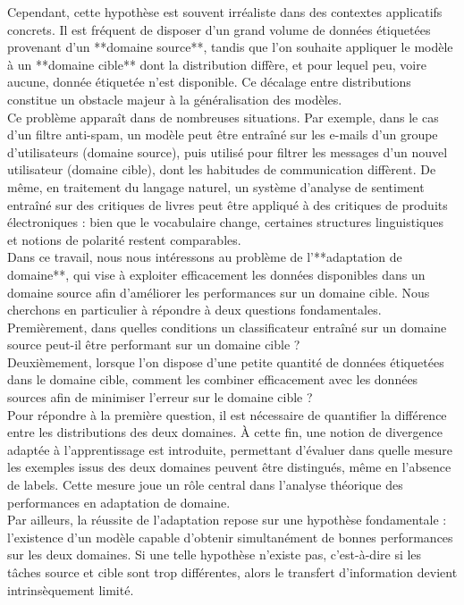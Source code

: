\documentclass[a4paper,12pt]{article}
\theoremstyle{definition}
\theoremstyle{remark}
\begin{document}
Cependant, cette hypothèse est souvent irréaliste dans des contextes applicatifs concrets. Il est fréquent de disposer d’un grand volume de données étiquetées provenant d’un **domaine source**, tandis que l’on souhaite appliquer le modèle à un **domaine cible** dont la distribution diffère, et pour lequel peu, voire aucune, donnée étiquetée n’est disponible. Ce décalage entre distributions constitue un obstacle majeur à la généralisation des modèles.\\

Ce problème apparaît dans de nombreuses situations. Par exemple, dans le cas d’un filtre anti-spam, un modèle peut être entraîné sur les e-mails d’un groupe d’utilisateurs (domaine source), puis utilisé pour filtrer les messages d’un nouvel utilisateur (domaine cible), dont les habitudes de communication diffèrent. De même, en traitement du langage naturel, un système d’analyse de sentiment entraîné sur des critiques de livres peut être appliqué à des critiques de produits électroniques : bien que le vocabulaire change, certaines structures linguistiques et notions de polarité restent comparables.\\

Dans ce travail, nous nous intéressons au problème de l’**adaptation de domaine**, qui vise à exploiter efficacement les données disponibles dans un domaine source afin d’améliorer les performances sur un domaine cible. Nous cherchons en particulier à répondre à deux questions fondamentales.\\
Premièrement, dans quelles conditions un classificateur entraîné sur un domaine source peut-il être performant sur un domaine cible ?\\
Deuxièmement, lorsque l’on dispose d’une petite quantité de données étiquetées dans le domaine cible, comment les combiner efficacement avec les données sources afin de minimiser l’erreur sur le domaine cible ?\\

Pour répondre à la première question, il est nécessaire de quantifier la différence entre les distributions des deux domaines. À cette fin, une notion de divergence adaptée à l’apprentissage est introduite, permettant d’évaluer dans quelle mesure les exemples issus des deux domaines peuvent être distingués, même en l’absence de labels. Cette mesure joue un rôle central dans l’analyse théorique des performances en adaptation de domaine.\\

Par ailleurs, la réussite de l’adaptation repose sur une hypothèse fondamentale : l’existence d’un modèle capable d’obtenir simultanément de bonnes performances sur les deux domaines. Si une telle hypothèse n’existe pas, c’est-à-dire si les tâches source et cible sont trop différentes, alors le transfert d’information devient intrinsèquement limité.\\
\end{document}
